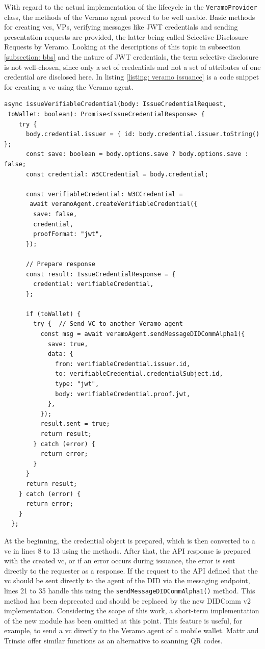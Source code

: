     With regard to the actual implementation of the lifecycle in the \texttt{VeramoProvider} class, the methods of the Veramo agent proved to be well usable. Basic methods for creating \acp{vc}, \acp{VP}, verifying messages like JWT credentials and sending presentation requests are provided, the latter being called Selective Disclosure Requests by Veramo. Looking at the descriptions of this topic in subsection \ref{subsection: bbs} and the nature of JWT credentials, the term selective disclosure is not well-chosen, since only a set of credentials and not a set of attributes of one credential are disclosed here. In listing \ref{listing: veramo issuance} is a code snippet for creating a \ac{vc} using the Veramo agent.
    \newline
        \begin{lstlisting}[style=ES6, caption=Issue a \ac{vc} with Veramo, label={listing: veramo issuance}]
async issueVerifiableCredential(body: IssueCredentialRequest, 
 toWallet: boolean): Promise<IssueCredentialResponse> {
    try {
      body.credential.issuer = { id: body.credential.issuer.toString() };
      const save: boolean = body.options.save ? body.options.save : false;
      const credential: W3CCredential = body.credential;
      
      const verifiableCredential: W3CCredential = 
       await veramoAgent.createVerifiableCredential({
        save: false,
        credential,
        proofFormat: "jwt",
      });

      // Prepare response
      const result: IssueCredentialResponse = {
        credential: verifiableCredential,
      };

      if (toWallet) {
        try {  // Send VC to another Veramo agent
          const msg = await veramoAgent.sendMessageDIDCommAlpha1({
            save: true,
            data: {
              from: verifiableCredential.issuer.id,
              to: verifiableCredential.credentialSubject.id,
              type: "jwt",
              body: verifiableCredential.proof.jwt,
            },
          });
          result.sent = true;
          return result;
        } catch (error) {
          return error;
        }
      }
      return result;
    } catch (error) {
      return error;
    }
  };\end{lstlisting}
    
        At the beginning, the credential object is prepared, which is then converted to a \ac{vc} in lines 8 to 13 using the methods. After that, the API response is prepared with the created \ac{vc}, or if an error occurs during issuance, the error is sent directly to the requester as a response. If the request to the API defined that the \ac{vc} should be sent directly to the agent of the \ac{DID} via the messaging endpoint, lines 21 to 35 handle this using the \texttt{sendMessageDIDCommAlpha1()} method. This method has been deprecated and should be replaced by the new DIDComm v2 implementation. Considering the scope of this work, a short-term implementation of the new module has been omitted at this point. This feature is useful, for example, to send a \ac{vc} directly to the Veramo agent of a mobile wallet. Mattr and Trinsic offer similar functions as an alternative to scanning QR codes.
    
